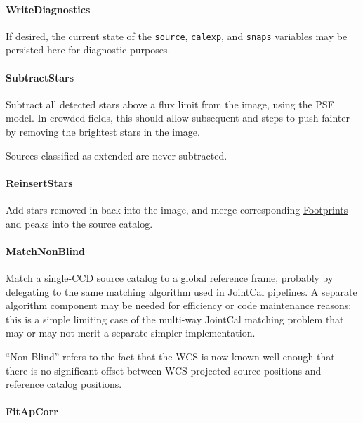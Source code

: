 \paragraph{WriteDiagnostics}
\label{sec:drpBootstrapImChar_WriteDiagnostics}

If desired, the current state of the \texttt{source}, \texttt{calexp}, and \texttt{snaps} variables may be persisted here for diagnostic purposes.

\paragraph{SubtractStars}
\label{sec:drpBootstrapImChar_SubtractStars}

Subtract all detected stars above a flux limit from the image, using the PSF model.  In crowded fields, this should allow subsequent  and  steps to push fainter by removing the brightest stars in the image.

Sources classified as extended are never subtracted.

\paragraph{ReinsertStars}
\label{sec:drpBootstrapImChar_ReinsertStars}

Add stars removed in  back into the image, and merge corresponding \hyperref[sec:spFootprints]{Footprints} and peaks into the source catalog.

\paragraph{MatchNonBlind}
\label{sec:drpBootstrapImChar_MatchNonBlind}

Match a single-CCD source catalog to a global reference frame, probably by delegating to \hyperref[sec:acJointCalMatching]{the same matching algorithm used in JointCal pipelines}.  A separate algorithm component may be needed for efficiency or code maintenance reasons; this is a simple limiting case of the multi-way JointCal matching problem that may or may not merit a separate simpler implementation.

``Non-Blind'' refers to the fact that the WCS is now known well enough that there is no significant offset between WCS-projected source positions and reference catalog positions.

\paragraph{FitApCorr}
\label{sec:drpBootstrapImChar_FitApCorr}

